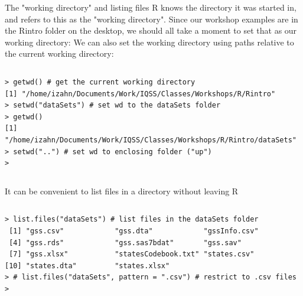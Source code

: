 \documentclass[table,smaller]{beamer}
\begin{document}
\begin{frame}[fragile,label=sec-4-2]{The "working directory" and listing files}
  R knows the directory it was started in, and refers to this as the "working directory". Since our workshop examples are in the Rintro folder on the desktop, we should all take a moment to set that as our working directory:
We can also set the working directory using paths relative to the current working directory:

\vspace{-.5em}
\begin{columns}
\begin{block}{}
\begin{verbatim}
> getwd() # get the current working directory
[1] "/home/izahn/Documents/Work/IQSS/Classes/Workshops/R/Rintro"
> setwd("dataSets") # set wd to the dataSets folder
> getwd()
[1] "/home/izahn/Documents/Work/IQSS/Classes/Workshops/R/Rintro/dataSets"
> setwd("..") # set wd to enclosing folder ("up")
>
\end{verbatim}
\end{block}
\end{columns}
\vspace{.5em}

It can be convenient to list files in a directory without leaving R
\vspace{-.5em}
\begin{columns}
\begin{block}{}
\begin{verbatim}
> list.files("dataSets") # list files in the dataSets folder
 [1] "gss.csv"            "gss.dta"            "gssInfo.csv"       
 [4] "gss.rds"            "gss.sas7bdat"       "gss.sav"           
 [7] "gss.xlsx"           "statesCodebook.txt" "states.csv"        
[10] "states.dta"         "states.xlsx"       
> # list.files("dataSets", pattern = ".csv") # restrict to .csv files  
>
\end{verbatim}
\end{block}
\end{columns}
\vspace{.5em}
\end{frame}
\end{document}
